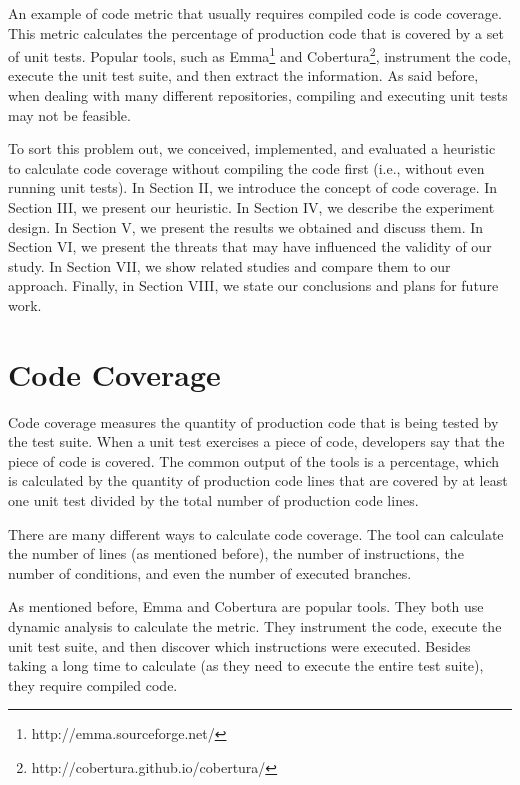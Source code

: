 \documentclass{sig-alternate}
\begin{document}
An example of code metric that usually requires compiled code is code coverage. 
This metric calculates the percentage of production code that is covered by a set of unit tests. Popular tools, such as Emma\footnote{http://emma.sourceforge.net/} and
Cobertura\footnote{http://cobertura.github.io/cobertura/}, instrument the code, execute
the unit test suite, and then extract the information. As said before, when dealing
with many different repositories, compiling and executing unit tests may not be
feasible.

To sort this problem out, we conceived, implemented, and evaluated a heuristic to calculate code coverage without compiling the code first (i.e., without even running unit tests). In Section II, we introduce the concept of code coverage. In Section III, we present our heuristic. In Section IV, we describe the experiment design. In Section V, we present the results we obtained and discuss them. In Section VI, we present the threats that may have influenced the validity of our study. In Section VII, we show related studies and compare them to our approach. Finally, in Section VIII, we state our conclusions and plans for future work.


\section{Code Coverage}

Code coverage measures the quantity of production code that is being tested by
the test suite. When a unit test exercises a piece of code, developers say that the piece
of code is covered. The common output of the tools is a percentage, which is calculated
by the quantity of production code lines that are covered by at least one unit test divided by
the total number of production code lines.

There are many different ways to calculate code coverage. The tool can calculate the number
of lines (as mentioned before), the number of instructions, the number of conditions, and even
the number of executed branches.

As mentioned before, Emma and Cobertura are popular tools. 
They both use dynamic analysis to calculate the metric. They instrument the code, 
execute the unit test suite, and then discover which instructions were executed.
Besides taking a long time to calculate (as they need to execute the entire test suite),
they require compiled code.
\end{document}
